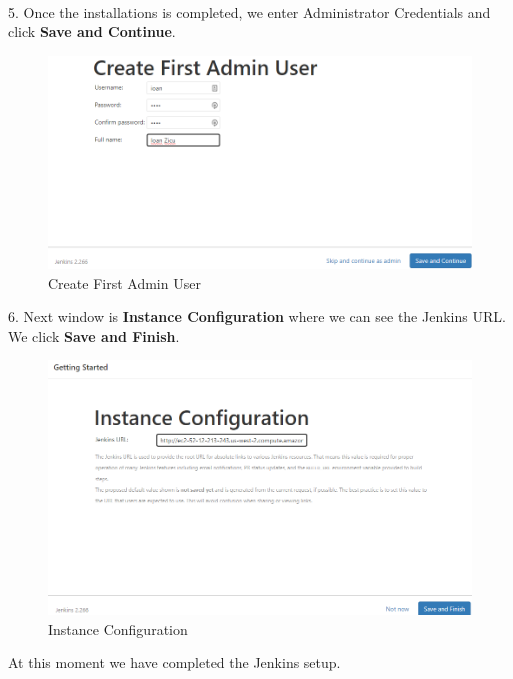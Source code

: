 \documentclass[12pt,a4paper,twoside]{article}
\begin{document}
~\newline


5. Once the installations is completed, we enter Administrator Credentials and click \textbf{Save and Continue}.


\begin{figure}[H]
    \centering
        \includegraphics[width=15cm]{images-aws/24-jenkins-admin-user.png}
        \caption{Create First Admin User}
\end{figure}


6. Next window is \textbf{Instance Configuration} where we can see the Jenkins URL. We click \textbf{Save and Finish}.


\begin{figure}[H]
    \centering
        \includegraphics[width=15cm]{images-aws/25-jenkins-conf.png}
        \caption{Instance Configuration}
\end{figure}


At this moment we have completed the Jenkins setup.
\end{document}
